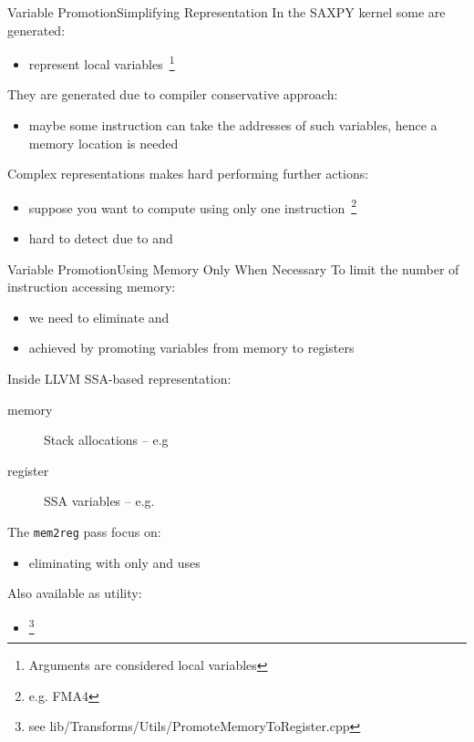 \begin{frame}{Variable Promotion}{Simplifying Representation}
In the SAXPY kernel some  are generated:

\begin{itemize}
\item represent \alert{local variables}~\footnote{Arguments are considered local variables}
\end{itemize}

\vfill
They are generated due to compiler \alert{conservative} approach:

\begin{itemize}
\item maybe some instruction can take the addresses of such variables, hence a
      memory location is needed
\end{itemize}

\vfill
Complex representations makes hard performing further actions:

\begin{itemize}
\item suppose you want to compute  using only one
      instruction~\footnote{e.g. FMA4}
\item hard to detect due to  and 
\end{itemize}
\end{frame}

\begin{frame}{Variable Promotion}{Using Memory Only When Necessary}
To limit the number of instruction accessing memory:

\begin{itemize}
\item we need to eliminate  and 
\item achieved by \alert{promoting} variables from memory to registers
\end{itemize}

\vfill
Inside LLVM SSA-based representation:

\begin{description}
\item[memory] Stack allocations --
              e.g 
\item[register] SSA variables -- e.g. 
\end{description}

\vfill
The \texttt{mem2reg} pass focus on:

\begin{itemize}
\item eliminating  with only  and
       uses
\end{itemize}

Also available as utility:

\begin{itemize}
\item {}\footnote{see lib/Transforms/Utils/PromoteMemoryToRegister.cpp}
\end{itemize}
\end{frame}

